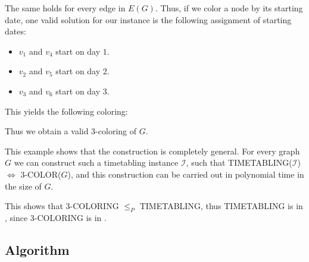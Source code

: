 The same holds for every edge in $E(G)$. Thus, if we color a node by its starting date, one valid solution for our instance is the following assignment of starting dates:

\begin{itemize}
\item $v_1$ and $v_4$ start on day $1$.
\item $v_2$ and $v_5$ start on day $2$.
\item $v_3$ and $v_6$ start on day $3$.
\end{itemize}

This yields the following coloring:

\begin{center}
\end{center}

Thus we obtain a valid 3-coloring of $G$.

This example shows that the construction is completely general. For every graph $G$ we can construct such a timetabling instance $\mathcal{I}$, such that TIMETABLING($\mathcal{I}$) $\iff$ 3-COLOR($G$), and this construction can be carried out in polynomial time in the size of $G$.

This shows that 3-COLORING $\le_P$ TIMETABLING, thus TIMETABLING is in \nph, since 3-COLORING is in \nph.

\newpage

\subsection{Algorithm}

